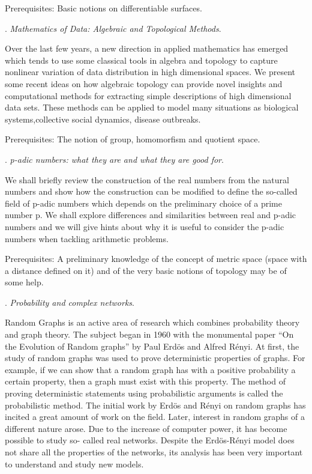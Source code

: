 \documentclass{article}
\def\noi{\noindent}
\begin{document}
\noi Prerequisites: Basic notions  on differentiable surfaces.

\vspace{22.9pt}

\noi {\bf Federica Galluzzi}.
{\it Mathematics of Data: Algebraic and Topological Methods}.

\noi Over the last few years, a new direction in applied mathematics has emerged which tends to use some classical tools in algebra and topology to capture nonlinear variation of data distribution in high dimensional spaces. We present some recent ideas on how algebraic topology can provide novel insights and computational methods for extracting simple descriptions of high dimensional data sets. These methods can be applied to model many situations as biological systems,collective social dynamics, disease outbreaks.

\noi Prerequisites: The notion of group, homomorfism
and quotient space.

\vspace{22.9pt}

\noi {\bf Andrea Mori}.
{\it p-adic numbers: what they are and what they are good for}.

\noi We shall briefly review the construction of the real numbers from the natural numbers and show how the construction can be modified to define the so-called field of p-adic numbers which depends on the preliminary choice of a prime number p. We shall explore differences and similarities between real and p-adic numbers and we will give hints about why it is useful to consider the p-adic numbers when tackling arithmetic problems.

\noi Prerequisites: A preliminary knowledge of the concept of metric space (space with a distance defined on it) and of the very basic notions of topology may be of some help.

\vspace{22.9pt}

\noi {\bf Angelica Pachon}.
{\it Probability and complex networks}.

\noi Random Graphs is an active area of research which combines probability  theory and graph theory. The subject began in 1960 with the monumental  paper ``On the Evolution of Random graphs'' by Paul Erd\"{o}s and Alfred  Rényi. At first, the study of random graphs was used to prove  deterministic properties of graphs. For example, if we can show that a  random graph has with a positive probability a certain property, then  a graph must exist with this property. The method of proving  deterministic statements using probabilistic arguments is called the  probabilistic method. The initial work by Erdös and Rényi on random graphs has incited a  great amount of work on the field. Later, interest in random graphs of  a different nature arose. Due to the increase of computer power, it  has become possible to study so- called real networks. Despite the  Erdös-Rényi model does not share all the properties of the networks,  its analysis has been very important to understand and study new  models.
\end{document}
